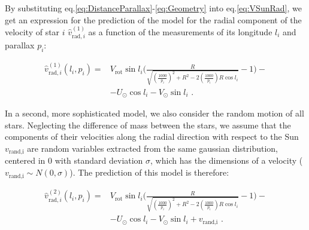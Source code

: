 


\noindent
By substituting eq.\ref{eq:DistanceParallax}-\ref{eq:Geometry} into eq.\ref{eq:VSunRad}, we get an expression for the prediction of the model for the radial component of the velocity of star $i$ $\hat{v}_{\text{rad},i}^{(1)}$ as a function of the measurements of its longitude $l_i$ and parallax $p_i$:

\begin{equation}\label{eq:VradModel1}
    \begin{aligned}
        \hat{v}_{\text{rad},i}^{(1)}(l_i, p_i) =&  V_{\text{rot}}\sin l_i \biggl( \frac{R}{\sqrt{(\frac{1000}{p_i})^2 + R^2 - 2(\frac{1000}{p_i})R \cos l_i}}-1 \biggr) -\\
        &- U_{\odot}\cos l_i - V_{\odot}\sin l_i \text{ .}
    \end{aligned}
\end{equation}

In a second, more sophisticated model, we also consider the random motion of all stars. Neglecting the difference of mass between the stars, we assume that the components of their velocities along the radial direction with respect to the Sun $v_{\text{rand,i}}$ are random variables extracted from the same gaussian distribution, centered in 0 with standard deviation $\sigma$, which has the dimensions of a velocity ($v_{\text{rand,i}} \sim N(0, \sigma)$). The prediction of this model is therefore:

\begin{equation}\label{eq:VradModel2}
    \begin{aligned}
        \hat{v}_{\text{rad},i}^{(2)}(l_i, p_i) =&  V_{\text{rot}}\sin l_i \biggl( \frac{R}{\sqrt{(\frac{1000}{p_i})^2 + R^2 - 2(\frac{1000}{p_i})R \cos l_i}}-1 \biggr) -\\
        &- U_{\odot}\cos l_i - V_{\odot}\sin l_i + v_{\text{rand,i}} \text{ .}
    \end{aligned}
\end{equation}
